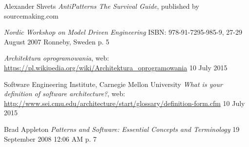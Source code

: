 \begin{thebibliography}{9}
     
    Alexander Shvets
    \emph{AntiPatterns The Survival Guide},
    published by sourcemaking.com
    
    
    \emph{Nordic Workshop on Model Driven Engineering}
    ISBN: 978-91-7295-985-9,
    27-29 August 2007 Ronneby, Sweden
    p. 5
    
    \emph{Architektura oprogramowania},
    web: \url{https://pl.wikipedia.org/wiki/Architektura_oprogramowania}
    10 July 2015
    
    Software Engineering Institute, Carnegie Mellon University
    \emph{What is your definition of software architecture?},
    web: \url{http://www.sei.cmu.edu/architecture/start/glossary/definition-form.cfm}
    10 July 2015
    
     Brad Appleton
     \emph{Patterns and Software: Essential Concepts and Terminology}
     19 September 2008 12:06 AM
     p. 7

\end{thebibliography}